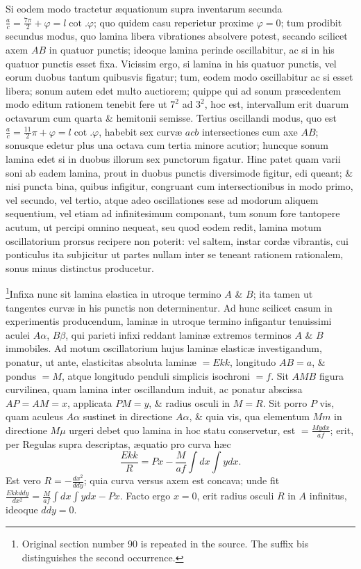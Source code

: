 Si eodem modo tractetur æquationum supra inventarum secunda $\frac ac=\frac{7\pi}2+\varphi=l\cot.\varphi$; quo quidem casu reperietur proxime $\varphi=0$; tum prodibit secundus modus, quo lamina libera vibrationes absolvere potest, secando scilicet axem $AB$ in quatuor punctis; ideoque lamina perinde oscillabitur, ac si in his quatuor punctis esset fixa. Vicissim ergo, si lamina in his quatuor punctis, vel eorum duobus tantum quibusvis figatur; tum, eodem modo oscillabitur ac si esset libera; sonum autem edet multo auctiorem; quippe qui ad sonum præcedentem modo editum rationem tenebit fere ut $7^2$ ad $3^2$, hoc est, intervallum erit duarum octavarum cum quarta \& hemitonii semisse.
Tertius oscillandi modus, quo est $\frac ac=\frac{11}2\pi+\varphi=l\cot.\varphi$, habebit sex curvæ $acb$ intersectiones cum axe $AB$; sonusque edetur plus una octava cum tertia minore acutior; huncque sonum lamina edet si in duobus illorum sex punctorum figatur. Hinc patet quam varii soni ab eadem lamina, prout in duobus punctis diversimode figitur, edi queant; \& nisi puncta bina, quibus infigitur, congruant cum intersectionibus in modo primo, vel secundo, vel tertio, atque adeo oscillationes sese ad modorum aliquem sequentium, vel etiam ad infinitesimum componant, tum sonum fore tantopere acutum, ut percipi omnino nequeat, seu quod eodem redit, lamina motum oscillatorium prorsus recipere non poterit: vel saltem, instar cordæ vibrantis, cui ponticulus ita subjicitur ut partes nullam inter se teneant rationem rationalem, sonus minus distinctus producetur.

\footnote{Original section number 90 is repeated in the source. The suffix bis distinguishes the second occurrence.}Infixa nunc sit lamina elastica in utroque termino $A$ \& $B$; ita tamen ut tangentes curvæ in his punctis non determinentur. Ad hunc scilicet casum in experimentis producendum, laminæ in utroque termino infigantur tenuissimi aculei $A\alpha$, $B\beta$, qui parieti infixi reddant laminæ extremos terminos $A$ \& $B$ immobiles. Ad motum oscillatorium hujus laminæ elasticæ investigandum, ponatur, ut ante, elasticitas absoluta laminæ $=Ekk$, longitudo $AB=a$, \& pondus $=M$, atque longitudo penduli simplicis isochroni $=f$. Sit $AMB$ figura curvilinea, quam lamina inter oscillandum induit, ac ponatur abscissa $AP=AM=x$, applicata $PM=y$, \& radius osculi in $M=R$. Sit porro $P$ vis, quam aculeus $A\alpha$ sustinet in directione $A\alpha$, \& quia vis, qua elementum $Mm$ in directione $M\mu$ urgeri debet quo lamina in hoc statu conservetur, est $=\frac{Mydx}{af}$; erit, per Regulas supra descriptas, æquatio pro curva hæc
\[\frac{Ekk}{R}=Px-\frac M{af}\int dx\int ydx.\]
Est vero $R=-\frac{dx^2}{ddy}$; quia curva versus axem est concava;
unde fit $\frac{Ekkddy}{dx^2}=\frac M{af}\int dx\int ydx-Px$. Facto ergo $x=0$, erit radius osculi $R$ in $A$ infinitus, ideoque $ddy=0$.

